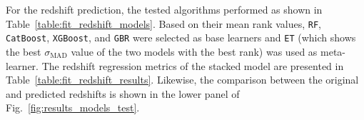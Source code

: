 \documentclass{aa}
\begin{document}
For the redshift prediction, the tested algorithms performed as shown in Table~\ref{table:fit_redshift_models}. 
Based on their mean rank values, \verb|RF|, \verb|CatBoost|, \verb|XGBoost|, and \verb|GBR| were selected as base learners and \verb|ET| (which shows the best $\sigma_{\mathrm{MAD}}$ value of the two models with the best rank) was used as meta-learner.
The redshift regression metrics of the stacked model are presented in Table~\ref{table:fit_redshift_results}. 
Likewise, the comparison between the original and predicted redshifts is shown in the lower panel of Fig.~\ref{fig:results_models_test}.

\begin{table}
\setlength{\tabcolsep}{3pt}
\caption{Redshift prediction metrics for the \textbf{test} subset \textbf{from} HETDEX \textbf{and} Stripe 82 \textbf{labelled sources} as discussed in Sect.~\ref{sec:results_prediction_pipeline}.}             %
\label{table:fit_redshift_results}      %
\centering                          %
\end{table}

\end{document}
